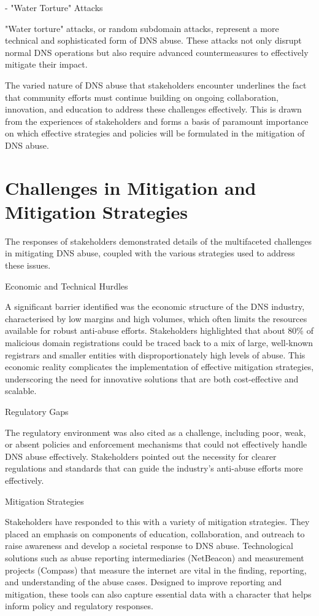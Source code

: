 - "Water Torture" Attacks

"Water torture" attacks, or random subdomain attacks, represent a more technical and sophisticated form of DNS abuse. These attacks not only disrupt normal DNS operations but also require advanced countermeasures to effectively mitigate their impact.

The varied nature of DNS abuse that stakeholders encounter underlines the fact that community efforts must continue building on ongoing collaboration, innovation, and education to address these challenges effectively. This is drawn from the experiences of stakeholders and forms a basis of paramount importance on which effective strategies and policies will be formulated in the mitigation of DNS abuse.

\section{Challenges in Mitigation and Mitigation Strategies} 

The responses of stakeholders demonstrated details of the multifaceted challenges in mitigating DNS abuse, coupled with the various strategies used to address these issues.

Economic and Technical Hurdles

A significant barrier identified was the economic structure of the DNS industry, characterised by low margins and high volumes, which often limits the resources available for robust anti-abuse efforts. Stakeholders highlighted that about 80\% of malicious domain registrations could be traced back to a mix of large, well-known registrars and smaller entities with disproportionately high levels of abuse. This economic reality complicates the implementation of effective mitigation strategies, underscoring the need for innovative solutions that are both cost-effective and scalable.

Regulatory Gaps

The regulatory environment was also cited as a challenge, including poor, weak, or absent policies and enforcement mechanisms that could not effectively handle DNS abuse effectively. Stakeholders pointed out the necessity for clearer regulations and standards that can guide the industry's anti-abuse efforts more effectively.

Mitigation Strategies

Stakeholders have responded to this with a variety of mitigation strategies. They placed an emphasis on components of education, collaboration, and outreach to raise awareness and develop a societal response to DNS abuse. Technological solutions such as abuse reporting intermediaries (NetBeacon) and measurement projects (Compass) that measure the internet are vital in the finding, reporting, and understanding of the abuse cases. Designed to improve reporting and mitigation, these tools can also capture essential data with a character that helps inform policy and regulatory responses.

